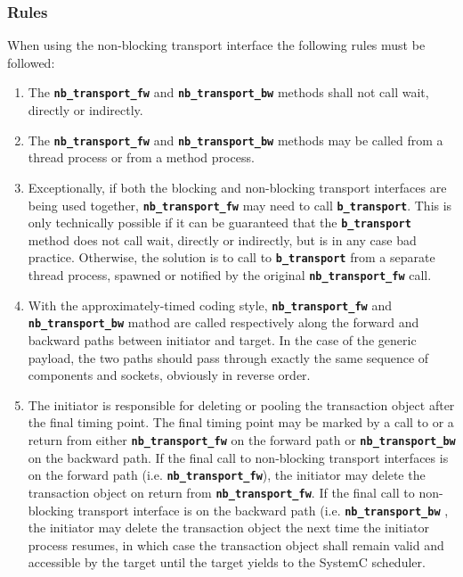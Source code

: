 {\subsubsection{Rules}
When using the non-blocking transport interface the following rules must be followed:
\begin{enumerate}
	\item The \texttt{\textbf{nb\_transport\_fw}} and \texttt{\textbf{nb\_transport\_bw}} methods shall not call wait, directly or indirectly.
	\item The \texttt{\textbf{nb\_transport\_fw}} and \texttt{\textbf{nb\_transport\_bw}} methods may be called from a thread process or from a method process.
	\item Exceptionally, if both the blocking and non-blocking transport interfaces are being used together, \texttt{\textbf{nb\_transport\_fw}} may need to call \texttt{\textbf{b\_transport}}. 
	This is only technically possible if it can be guaranteed that the \texttt{\textbf{b\_transport}} method does not call wait, directly or indirectly, but is in any case bad practice.
	Otherwise, the solution is to call to \texttt{\textbf{b\_transport}} from a separate thread process, spawned or notified by the original \texttt{\textbf{nb\_transport\_fw}} call.
	\item With the approximately-timed coding style, \texttt{\textbf{nb\_transport\_fw}} and \texttt{\textbf{nb\_transport\_bw}} mathod are called respectively along the forward and backward paths between initiator and target. 
	In the case of the generic payload, the two paths should pass through exactly the same sequence of components and sockets, obviously in reverse order.
	\item The initiator is responsible for deleting or pooling the transaction object after the final timing point. 
	The final timing point may be marked by a call to or a return from either \texttt{\textbf{nb\_transport\_fw}} on the forward path or \texttt{\textbf{nb\_transport\_bw}} on the backward path. 
	If the final call to non-blocking transport interfaces is on the forward path (i.e. \texttt{\textbf{nb\_transport\_fw}}), the initiator may delete the transaction object on return from \texttt{\textbf{nb\_transport\_fw}}.
	If the final call to non-blocking transport interface is on the backward path (i.e. \texttt{\textbf{nb\_transport\_bw}} , the initiator may delete the transaction object the next time the initiator process resumes, in which case the transaction object shall remain valid and accessible by the target until the target yields to the SystemC scheduler. 

\end{enumerate}}
